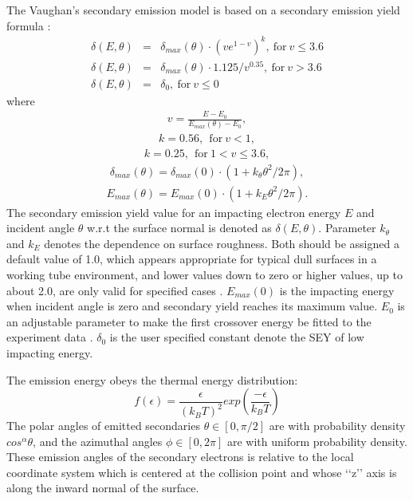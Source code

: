 The Vaughan's secondary emission model is based on a secondary emission yield formula \cite{Vaughan, VaughanRv}:
\begin{subequations}
\label{allequations}
\begin{eqnarray}
    \delta(E,\theta)&=&\delta_{max}(\theta)\cdot (v e^{1-v})^k,\ \text{for}\ v \le 3.6 \label{eq:VaughanA}
\\
\delta(E,\theta)&=&\delta_{max}(\theta)\cdot 1.125/v^{0.35},\ \text{for}\ v > 3.6 \label{eq:VaughanB}
\\
\delta(E,\theta)&=&\delta_0,\ \text{for}\ v \le 0 \label{eq:VaughanC}
\end{eqnarray}
\end{subequations}
where
\begin{eqnarray*}
v=\frac{\displaystyle E-E_0}{\displaystyle E_{max}(\theta)-E_0},
\end{eqnarray*}
\begin{eqnarray*}
k=0.56,\ \ \text{for}\ v<1,
\end{eqnarray*}
\begin{eqnarray*}
k=0.25,\ \ \text{for}\ 1<v\le{3.6},
\end{eqnarray*}
\begin{eqnarray*}
\delta_{max}(\theta)=\delta_{max}(0)\cdot (1+k_{\theta}\theta^2/2\pi),
\end{eqnarray*}
\begin{eqnarray*}
E_{max}(\theta)=E_{max}(0)\cdot (1+k_E\theta^2/2\pi).
\end{eqnarray*}
The secondary emission yield value for an impacting electron energy $E$ and incident angle $\theta$ w.r.t the surface normal is denoted as $\delta(E,\theta)$. Parameter $k_{\theta}$ and $k_E$ denotes the dependence on surface roughness. Both
should be assigned a default value of 1.0, which appears appropriate for typical dull surfaces in a working tube environment, and lower values down to zero or higher values, up to about 2.0, are only valid for specified cases \cite{Vaughan}. $E_{max}(0)$ is the impacting energy when incident angle is zero and secondary yield reaches its maximum value. $E_0$ is an adjustable parameter to make the first crossover energy be fitted to the experiment data \cite{FS}. $\delta_0$ is the user specified constant denote the SEY of low impacting energy.

The emission energy obeys the thermal energy distribution:
\begin{equation}
f(\epsilon) = \frac{\epsilon}{(k_BT)^2}exp\left(\frac{-\epsilon}{k_BT}\right) \label{eq:emienergy}
\end{equation}
The polar angles of emitted secondaries $\theta \in [0, \pi/2]$ are with probability density $cos^{\alpha}\theta$, and the azimuthal angles $\phi \in [0, 2\pi]$ are with uniform probability density. These emission angles of the secondary electrons is relative to the local coordinate system which is centered at the collision point and whose ‘‘z’’ axis is along the inward normal of the surface.

